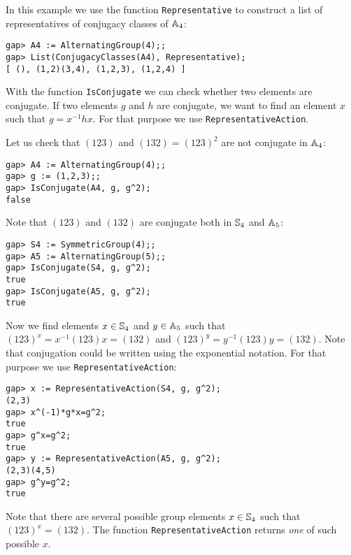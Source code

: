 \begin{example}
\label{exa:Representative}
In this example we use the function \lstinline{Representative} to construct a
list of representatives of conjugacy classes of $\mathbb{A}_4$:
\begin{lstlisting}
gap> A4 := AlternatingGroup(4);;
gap> List(ConjugacyClasses(A4), Representative);
[ (), (1,2)(3,4), (1,2,3), (1,2,4) ]
\end{lstlisting}
\end{example}

With the function \lstinline{IsConjugate} we can check whether two elements are
conjugate.  If two elements $g$ and $h$ are conjugate, we want to find an
element $x$ such that $g=x^{-1}hx$. For that purpose we use
\lstinline{RepresentativeAction}.

\begin{example}
\label{exa:RepresentativeAction}
Let us check that $(123)$ and $(132)=(123)^2$ are not conjugate in $\mathbb{A}_4$: 
\begin{lstlisting}
gap> A4 := AlternatingGroup(4);;
gap> g := (1,2,3);;
gap> IsConjugate(A4, g, g^2);
false
\end{lstlisting}
Note that $(123)$ and $(132)$ are conjugate both 
in $\mathbb{S}_4$ and $\mathbb{A}_5$:
\begin{lstlisting}
gap> S4 := SymmetricGroup(4);;
gap> A5 := AlternatingGroup(5);;
gap> IsConjugate(S4, g, g^2);
true
gap> IsConjugate(A5, g, g^2);
true
\end{lstlisting}
Now we find elements $x\in\mathbb{S}_4$ and $y\in\mathbb{A}_5$ such that 
$(123)^x=x^{-1}(123)x=(132)$ and
$(123)^y=y^{-1}(123)y=(132)$. Note that conjugation could be written
using the exponential notation. For that purpose we
use \lstinline{RepresentativeAction}:
\begin{lstlisting}
gap> x := RepresentativeAction(S4, g, g^2);
(2,3)
gap> x^(-1)*g*x=g^2;
true
gap> g^x=g^2;
true
gap> y := RepresentativeAction(A5, g, g^2);
(2,3)(4,5)
gap> g^y=g^2;
true
\end{lstlisting}
Note that there are several possible group elements $x\in\mathbb{S}_4$ 
such that $(123)^x=(132)$. The 
function \lstinline{RepresentativeAction} returns \emph{one}
of such possible $x$. 
\end{example}

